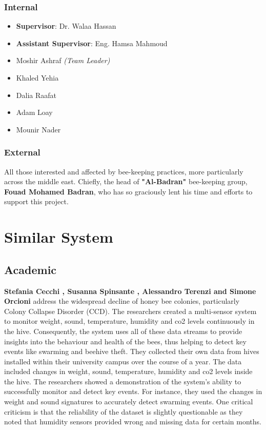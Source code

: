 \documentclass[12pt]{article}
\begin{document}
	\subsubsection{Internal}
	\begin{itemize}
		\item \textbf{Supervisor}: Dr. Walaa Hassan 
		\item \textbf{Assistant Supervisor}: Eng. Hamsa Mahmoud
		\item Moshir Ashraf \small\textit{(Team Leader)}
		\item Khaled Yehia 
		\item Dalia Raafat
		\item Adam Loay
		\item Mounir Nader
	\end{itemize}
	\subsubsection{External}
	All those interested and affected by bee-keeping practices, more particularly across the middle east. Chiefly, the head of \textbf{"Al-Badran"} bee-keeping group, \textbf{Fouad Mohamed Badran}, who has so graciously lent his time and efforts to support this project.
	
	\section{Similar System}
	\subsection{Academic}
	\noindent \textbf{Stefania Cecchi , Susanna Spinsante , Alessandro Terenzi and Simone Orcioni} \cite{cecchi2020smart} address the widespread decline of honey bee colonies, particularly Colony Collapse Disorder (CCD). The researchers created a multi-sensor  system to monitor weight, sound, temperature, humidity and co2 levels continuously in the hive. Consequently, the system uses all of these data streams to provide insights into the behaviour and health of the bees, thus helping to detect key events like swarming and beehive theft. They collected their own data from hives installed within their university campus over the course of a year. The data included changes in weight, sound, temperature, humidity and co2 levels inside the hive. The researchers showed a demonstration of the system's ability to successfully monitor and detect key events. For instance, they used the changes in weight and sound signatures to accurately detect swarming events. One critical criticism is that the reliability of the dataset is slightly questionable as they noted that humidity sensors provided wrong and missing data for certain months. \\ \newline
	
\end{document}
